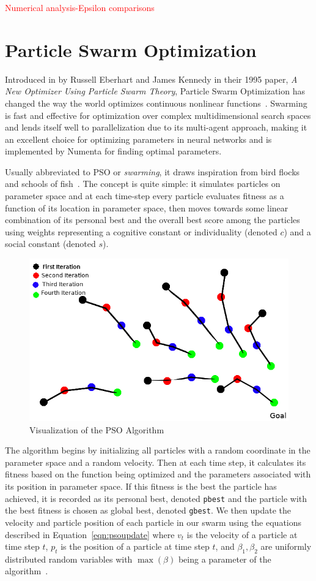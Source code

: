 \documentclass[oneside,12pt,openany]{book}
\begin{document}
	\textcolor{red}{Numerical analysis-Epsilon comparisons}
	
	\section{Particle Swarm Optimization}
	
	Introduced in by Russell Eberhart and James Kennedy in their 1995 paper, \textit{A New Optimizer Using Particle Swarm Theory}, Particle Swarm Optimization has changed the way the world optimizes continuous nonlinear functions~\cite{PSOReview}. Swarming is fast and effective for optimization over complex multidimensional search spaces and lends itself well to parallelization due to its multi-agent approach, making it an excellent choice for optimizing parameters in neural networks and is implemented by Numenta for finding optimal parameters.
	
	Usually abbreviated to PSO or \textit{swarming}, it draws inspiration from bird flocks and schools of fish~\cite{Eberhart}. The concept is quite simple: it simulates particles on parameter space and at each time-step every particle evaluates fitness as a function of its location in parameter space, then moves towards some linear combination of its personal best and the overall best score among the particles using weights representing a cognitive constant or individuality (denoted $c$) and a social constant (denoted $s$).
	
	\begin{figure}[h!]
		\centering
		\includegraphics[width=.7\linewidth]{images/PSOVisual.png}
		\caption{Visualization of the PSO Algorithm}
		\label{fig:PSOVisual}
	\end{figure}
	
	The algorithm begins by initializing all particles with a random coordinate in the parameter space and a random velocity. Then at each time step, it calculates its fitness based on the function being optimized and the parameters associated with its position in parameter space. If this fitness is the best the particle has achieved, it is recorded as its personal best, denoted \texttt{pbest} and the particle with the best fitness is chosen as global best, denoted \texttt{gbest}. We then update the velocity and particle position of each particle in our swarm using the equations described in Equation~\eqref{eqn:psoupdate} where $v_{t}$ is the velocity of a particle at time step $t$, $p_{t}$ is the position of a particle at time step $t$, and $\beta_{1}, \beta_{2}$ are uniformly distributed random variables with $\max(\beta)$ being a parameter of the algorithm~\cite{PSOReview}.
	
\end{document}
